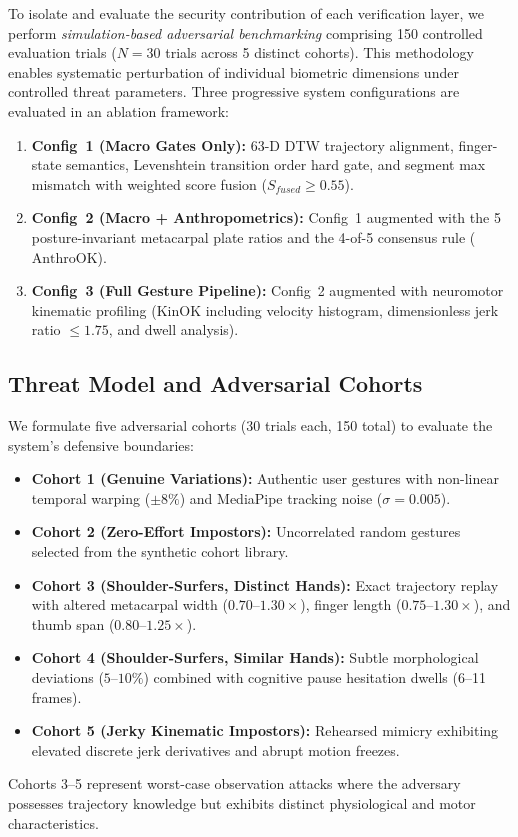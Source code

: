 \documentclass[conference]{IEEEtran}
\begin{document}
To isolate and evaluate the security contribution of each verification layer, we perform \textit{simulation-based adversarial benchmarking} comprising 150 controlled evaluation trials ($N = 30$ trials across 5 distinct cohorts). This methodology enables systematic perturbation of individual biometric dimensions under controlled threat parameters. Three progressive system configurations are evaluated in an ablation framework:
\begin{enumerate}
\item \textbf{Config~1 (Macro Gates Only):} 63-D DTW trajectory alignment, finger-state semantics, Levenshtein transition order hard gate, and segment max mismatch with weighted score fusion ($S_{fused} \ge 0.55$).
\item \textbf{Config~2 (Macro + Anthropometrics):} Config~1 augmented with the 5 posture-invariant metacarpal plate ratios and the 4-of-5 consensus rule ($\text{AnthroOK}$).
\item \textbf{Config~3 (Full Gesture Pipeline):} Config~2 augmented with neuromotor kinematic profiling ($\text{KinOK}$ including velocity histogram, dimensionless jerk ratio $\le 1.75$, and dwell analysis).
\end{enumerate}

\subsection{Threat Model and Adversarial Cohorts}

We formulate five adversarial cohorts (30 trials each, 150 total) to evaluate the system's defensive boundaries:
\begin{itemize}
\item \textbf{Cohort 1 (Genuine Variations):} Authentic user gestures with non-linear temporal warping ($\pm 8\%$) and MediaPipe tracking noise ($\sigma = 0.005$).
\item \textbf{Cohort 2 (Zero-Effort Impostors):} Uncorrelated random gestures selected from the synthetic cohort library.
\item \textbf{Cohort 3 (Shoulder-Surfers, Distinct Hands):} Exact trajectory replay with altered metacarpal width ($0.70\text{--}1.30\times$), finger length ($0.75\text{--}1.30\times$), and thumb span ($0.80\text{--}1.25\times$).
\item \textbf{Cohort 4 (Shoulder-Surfers, Similar Hands):} Subtle morphological deviations ($5\text{--}10\%$) combined with cognitive pause hesitation dwells (6--11 frames).
\item \textbf{Cohort 5 (Jerky Kinematic Impostors):} Rehearsed mimicry exhibiting elevated discrete jerk derivatives and abrupt motion freezes.
\end{itemize}
Cohorts 3--5 represent worst-case observation attacks where the adversary possesses trajectory knowledge but exhibits distinct physiological and motor characteristics.
\end{document}
